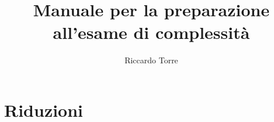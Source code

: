 \documentclass[italian,10pt,a4paper]{report}
\title{Manuale per la preparazione all'esame di complessità}
\author{Riccardo Torre}
\begin{document}
	\maketitle
	\chapter{Riduzioni}
	
\end{document}
